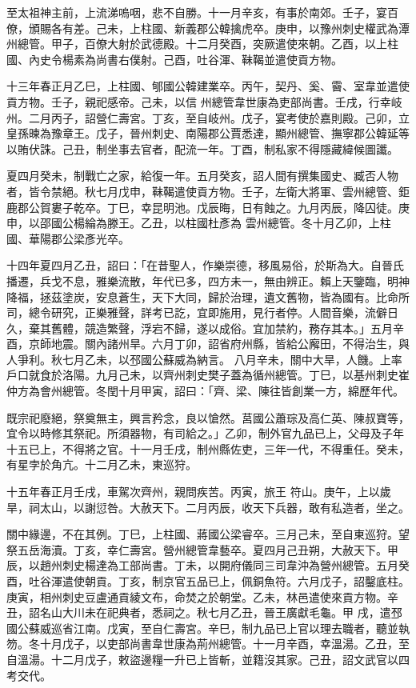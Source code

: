 \begin{pinyinscope}
 至太祖神主前，上流涕嗚咽，悲不自勝。十一月辛亥，有事於南郊。壬子，宴百僚，頒賜各有差。己未，上柱國、新義郡公韓擒虎卒。庚申，以豫州刺史權武為潭州總管。甲子，百僚大射於武德殿。十二月癸酉，突厥遣使來朝。乙酉，以上柱國、內史令楊素為尚書右僕射。己酉，吐谷渾、靺鞨並遣使貢方物。



 十三年春正月乙巳，上柱國、郇國公韓建業卒。丙午，契丹、奚、霫、室韋並遣使貢方物。壬子，親祀感帝。己未，以信
 州總管韋世康為吏部尚書。壬戌，行幸岐州。二月丙子，詔營仁壽宮。丁亥，至自岐州。戊子，宴考使於嘉則殿。己卯，立皇孫暕為豫章王。戊子，晉州刺史、南陽郡公賈悉達，顯州總管、撫寧郡公韓延等以賄伏誅。己丑，制坐事去官者，配流一年。丁酉，制私家不得隱藏緯候圖讖。



 夏四月癸未，制戰亡之家，給復一年。五月癸亥，詔人間有撰集國史、臧否人物者，皆令禁絕。秋七月戊申，靺鞨遣使貢方物。壬子，左衛大將軍、雲州總管、鉅鹿郡公賀婁子乾卒。丁巳，幸昆明池。戊辰晦，日有蝕之。九月丙辰，降囚徒。庚申，以邵國公楊綸為滕王。乙丑，以柱國杜彥為
 雲州總管。冬十月乙卯，上柱國、華陽郡公梁彥光卒。



 十四年夏四月乙丑，詔曰：「在昔聖人，作樂崇德，移風易俗，於斯為大。自晉氏播遷，兵戈不息，雅樂流散，年代已多，四方未一，無由辨正。賴上天鑒臨，明神降福，拯茲塗炭，安息蒼生，天下大同，歸於治理，遺文舊物，皆為國有。比命所司，總令研究，正樂雅聲，詳考已訖，宜即施用，見行者停。人間音樂，流僻日久，棄其舊體，競造繁聲，浮宕不歸，遂以成俗。宜加禁約，務存其本。」五月辛酉，京師地震。關內諸州旱。六月丁卯，詔省府州縣，皆給公廨田，不得治生，與人爭利。秋七月乙未，以邳國公蘇威為納言。
 八月辛未，關中大旱，人饑。上率戶口就食於洛陽。九月己未，以齊州刺史樊子蓋為循州總管。丁巳，以基州刺史崔仲方為會州總管。冬閏十月甲寅，詔曰：「齊、梁、陳往皆創業一方，綿歷年代。



 既宗祀廢絕，祭奠無主，興言矜念，良以愴然。莒國公蕭琮及高仁英、陳叔寶等，宜令以時修其祭祀。所須器物，有司給之。」乙卯，制外官九品已上，父母及子年十五已上，不得將之官。十一月壬戌，制州縣佐吏，三年一代，不得重任。癸未，有星孛於角亢。十二月乙未，東巡狩。



 十五年春正月壬戌，車駕次齊州，親問疾苦。丙寅，旅王
 符山。庚午，上以歲旱，祠太山，以謝愆咎。大赦天下。二月丙辰，收天下兵器，敢有私造者，坐之。



 關中緣邊，不在其例。丁巳，上柱國、蔣國公梁睿卒。三月己未，至自東巡狩。望祭五岳海瀆。丁亥，幸仁壽宮。營州總管韋藝卒。夏四月己丑朔，大赦天下。甲辰，以趙州刺史楊達為工部尚書。丁未，以開府儀同三司韋沖為營州總管。五月癸酉，吐谷渾遣使朝貢。丁亥，制京官五品已上，佩銅魚符。六月戊子，詔鑿底柱。庚寅，相州刺史豆盧通貢綾文布，命焚之於朝堂。乙未，林邑遣使來貢方物。辛丑，詔名山大川未在祀典者，悉祠之。秋七月乙丑，晉王廣獻毛龜。甲
 戌，遣邳國公蘇威巡省江南。戊寅，至自仁壽宮。辛巳，制九品已上官以理去職者，聽並執笏。冬十月戊子，以吏部尚書韋世康為荊州總管。十一月辛酉，幸溫湯。乙丑，至自溫湯。十二月戊子，敕盜邊糧一升已上皆斬，並籍沒其家。己丑，詔文武官以四考交代。




\end{pinyinscope}
